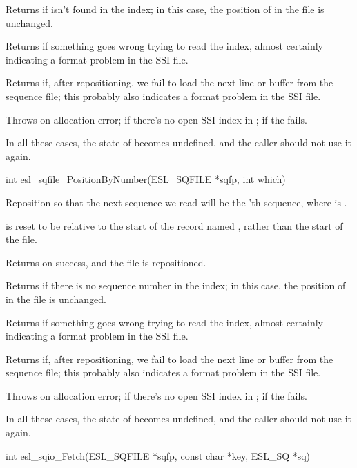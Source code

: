 \begin{sreapi}
Returns  if  isn't found in the
index; in this case, the position of  in the file
is unchanged.

Returns  if something goes wrong trying to
read the index, almost certainly indicating a format
problem in the SSI file.

Returns  if, after repositioning, we fail to
load the next line or buffer from the sequence file;
this probably also indicates a format problem in the SSI
file.

Throws    on allocation error;
 if there's no open SSI index in ;
   if the  fails.

In all these cases, the state of  becomes
undefined, and the caller should not use it again.


\hypertarget{func:esl_sqfile_PositionByNumber()}
{\item[int esl\_sqfile\_PositionByNumber(ESL\_SQFILE *sqfp, int which)]}

Reposition  so that the next sequence we 
read will be the 'th sequence, where 
is . 

 is reset to be relative to the start
of the record named , rather than the start of the
file.

Returns  on success, and the file  is repositioned.

Returns  if there is no sequence number
 in the index; in this case, the position of
 in the file is unchanged.

Returns  if something goes wrong trying to
read the index, almost certainly indicating a format
problem in the SSI file.

Returns  if, after repositioning, we fail to
load the next line or buffer from the sequence file;
this probably also indicates a format problem in the SSI
file.

Throws    on allocation error;
 if there's no open SSI index in ;
   if the  fails.

In all these cases, the state of  becomes
undefined, and the caller should not use it again.


\hypertarget{func:esl_sqio_Fetch()}
{\item[int esl\_sqio\_Fetch(ESL\_SQFILE *sqfp, const char *key, ESL\_SQ *sq)]}


\end{sreapi}

